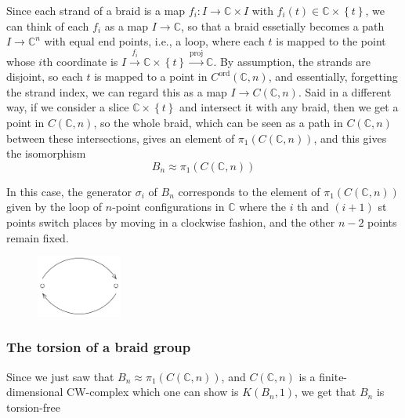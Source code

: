 \documentclass[reqno]{amsart}
\theoremstyle{definition}
\theoremstyle{remark}
\begin{document}
Since each strand of a braid is a map
$f_i \colon I \to \mathbb{C} \times I$ with
$f_i(t) \in \mathbb{C} \times \left\{ t \right\} $, we can
think of each $f_i$ as a map
$I \to \mathbb{C}$, so that
a braid essetially becomes a path
$I \to \mathbb{C}^{n}$ with equal end points, i.e., a loop, where
each $t$ is mapped to the point
whose $i$th coordinate is $I \stackrel{f_i}{\to} \mathbb{C} 
\times \left\{ t \right\} \stackrel{\text{proj}}{\to }
\mathbb{C}
$. By assumption, the strands are disjoint, so
each  $t$ is mapped to a point in
$C^{\text{ord}}\left( \mathbb{C},n \right) $,
and essentially, forgetting
the strand index, we can regard this as a map
$I \to C \left( \mathbb{C}, n \right) $. Said in a different
way, if we consider a slice $\mathbb{C} \times \left\{ t \right\} $
and intersect it with any braid, then we get a point
in $C \left( \mathbb{C},n \right) $, so the whole braid,
which can be seen as a path in $C \left( \mathbb{C},n \right) $ 
between these intersections, gives an element
of $\pi_1 \left( C \left( \mathbb{C},n \right)  \right) $, and
this
gives the isomorphism
\[
B_n \approx \pi_1 \left( C \left( \mathbb{C}, n \right)  \right) 
\] 

In this case, the generator 
$\sigma_i$ of $B_n$ corresponds to the element
of $\pi_1 \left( C \left( \mathbb{C},n \right)  \right) $ 
given by the loop of $n$-point configurations in
$\mathbb{C}$ where the $i$ th and $\left( i+1 \right) $ st
points switch places by moving in a clockwise fashion,
and the other $n-2$ points remain fixed.

\begin{figure}[htpb]
    \centering
    \includegraphics[width=0.25\textwidth]{sigma_i_configuration.png}
    \label{fig:sigma_i_configuration-png}
\end{figure}

\subsubsection{The torsion of a braid group}

Since we just saw that
$B_n \approx \pi_1 \left( C \left( \mathbb{C},n \right)  \right) $,
and $C \left( \mathbb{C},n \right) $ 
is a finite-dimensional CW-complex which one
can show is
$K\left( B_n, 1 \right) $, we get that
$B_n$ is torsion-free~\cite[Prop~2.45]{Hatcher}
\end{document}
